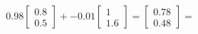 \documentclass[preview]{standalone}
\begin{document}
\begin{align*}
0.98 \begin{bmatrix} 0.8 \\ 0.5 \end{bmatrix} + -0.01 \begin{bmatrix} 1 \\ 1.6 \end{bmatrix} = \begin{bmatrix} 0.78 \\ 0.48 \end{bmatrix} =
\end{align*}
\end{document}
